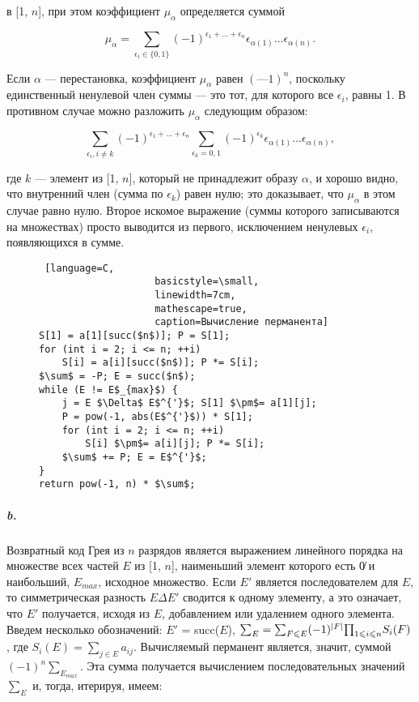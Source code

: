 \documentclass{../../template/mai_book}
\DeclarePairedDelimiter{\abs}{\lvert}{\rvert}
\begin{document}

\noindent
[1, $n$] в [1, $n$], при этом коэффициент $\mu_\alpha$ определяется суммой

\begin{equation*}
\mu_{\alpha} = \sum_{\epsilon_i\in\{0,1\}} (-1)^{\epsilon_1+...+\epsilon_n} \epsilon_{\alpha(1)}...\epsilon_{\alpha(n)}.
\end{equation*}

\noindent
Если $\alpha$ — перестановка, коэффициент $\mu_\alpha$ равен $(—1)^n$, поскольку единственный ненулевой член суммы — это тот, для которого все $\epsilon_i$, равны 1. В противном случае можно разложить $\mu_\alpha$ следующим образом:

\begin{equation*}
\sum_{\epsilon_i, i \neq k} (-1)^{\epsilon_1+...+\epsilon_n} \sum_{\epsilon_k=0,1} (-1)^{\epsilon_k} \epsilon_{\alpha(1)}...\epsilon_{\alpha(n)},
\end{equation*}

\noindent
где $k$ — элемент из [1, $n$], который не принадлежит образу $\alpha$, и хорошо видно, что внутренний член (сумма по $\epsilon_k$) равен нулю; это доказывает, что $\mu_\alpha$ в этом случае равно нулю. Второе искомое выражение (суммы которого записываются на множествах) просто выводится из первого, исключением ненулевых $\epsilon_i$, появляющихся в сумме.

\setcounter{lstlisting}{11}

\begin{wrapfigure}{r}{7cm}
\begin{lstlisting} [language=C,
					basicstyle=\small,
					linewidth=7cm, 
					mathescape=true, 
					caption=Вычисление перманента]
S[1] = a[1][succ($n$)]; P = S[1];
for (int i = 2; i <= n; ++i)
	S[i] = a[i][succ($n$)]; P *= S[i];
$\sum$ = -P; E = succ($n$);
while (E != E$_{max}$) {
	j = E $\Delta$ E$^{'}$; S[1] $\pm$= a[1][j];
	P = pow(-1, abs(E$^{'}$)) * S[1];
	for (int i = 2; i <= n; ++i)
		S[i] $\pm$= a[i][j]; P *= S[i];
	$\sum$ += P; E = E$^{'}$;
}
return pow(-1, n) * $\sum$;
\end{lstlisting}
\end{wrapfigure}

\subparagraph{b.} Возвратный код Грея из $n$ разрядов является выражением линейного порядка на множестве всех частей $E$ из [1, $n$], наименьший элемент которого есть 0̸  и наибольший, $E_{max}$, исходное множество. Если $E'$ является последователем для $E$, то симметрическая разность $E \Delta E'$ сводится к одному элементу, а это означает, что $E'$ получается, исходя из $E$, добавлением или удалением одного элемента. Введем несколько обозначений: $E'$ = succ($E$), ${\sum}_E = {\sum}_{F \leqslant E} (-1)^{\abs{F}} {\prod}_{1 \leqslant i \leqslant n} S_i (F)$, где $S_i (E) = {\sum}_{j \in E} a_{ij}$. Вычисляемый перманент является, значит, суммой $(-1)^n {\sum}_{E_{max}}$. Эта сумма получается вычислением последовательных значений ${\sum}_E$ и, тогда, итерируя, имеем:
\end{document}
